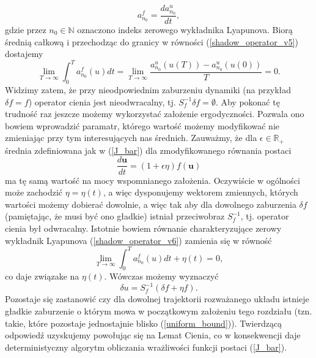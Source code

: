 \documentclass[12pt]{article}
\begin{document}
\begin{equation}
a^{f}_{n_{0}} = \frac{da^{u}_{n_{0}}}{dt},
\label{shadow_operator_v5}
\end{equation}
gdzie przez $ n_{0} \in \mathbb{N} $ oznaczono indeks zerowego wykładnika Lyapunova. Biorą średnią całkową i przechodząc do granicy w równości (\ref{shadow_operator_v5}) dostajemy
\begin{equation}
\lim\limits_{T\rightarrow \infty}\int_{0}^{T}a^{f}_{n_{0}}(u)dt = \lim\limits_{T\rightarrow \infty} \frac{a^{u}_{n_{0}}(u(T))-a^{u}_{n_{0}}(u(0))}{T} = 0.
\label{shadow_operator_v6}
\end{equation}
Widzimy zatem, że przy nieodpowiednim zaburzeniu dynamiki (na przykład $ \delta f = f $) operator cienia jest nieodwracalny, tj. $ S^{-1}_{f} \delta f = \emptyset$.\newline
Aby pokonać tę trudność raz jeszcze możemy wykorzystać założenie ergodyczności. Pozwala ono bowiem wprowadzić paramatr, którego wartość możemy modyfikować nie zmieniając przy tym interesujących nas średnich. Zauważmy, że dla $ \epsilon \in \mathbb{R}_{+} $  średnia zdefiniowana jak w (\ref{J_bar}) dla zmodyfikowanego równania postaci
\begin{equation}
\frac{d\textbf{u}}{dt} = (1 + \epsilon \eta)f(\textbf{u})
\end{equation}
ma tę samą wartość na mocy wspomnianego założenia. Oczywiście w ogólności może zachodzić $ \eta = \eta(t) $, a więc dysponujemy wektorem zmiennych, których wartości możemy dobierać dowolnie, a więc tak aby dla dowolnego zaburzenia $ \delta f$ (pamiętając, że musi być ono gładkie) istniał przeciwobraz $ S^{-1}_{f} $, tj. operator cienia był odwracalny. Istotnie bowiem równanie charakteryzujące zerowy wykładnik Lyapunova (\ref{shadow_operator_v6}) zamienia się w równość
\begin{equation}
\lim\limits_{T\rightarrow \infty}\int_{0}^{T}a^{f}_{n_{0}}(u)dt + \eta(t) = 0,
\end{equation}
co daje związake na $ \eta(t) $. Wówczas możemy wyznaczyć
\begin{equation}
\delta u = S^{-1}_{f}(\delta f + \eta f).
\label{shadow_operator_8}
\end{equation}
Pozostaje się zastanowić czy dla dowolnej trajektorii rozważanego układu istnieje gładkie zaburzenie o którym mowa w początkowym założeniu tego rozdziału (tzn. takie, które pozostaje jednostajnie blisko (\ref{uniform_bound})). Twierdzącą odpowiedź uzyskujemy powołując się na Lemat Cienia, co w konsekwencji daje deterministyczny algorytm obliczania wrażliwości funkcji postaci (\ref{J_bar}).
\end{document}
